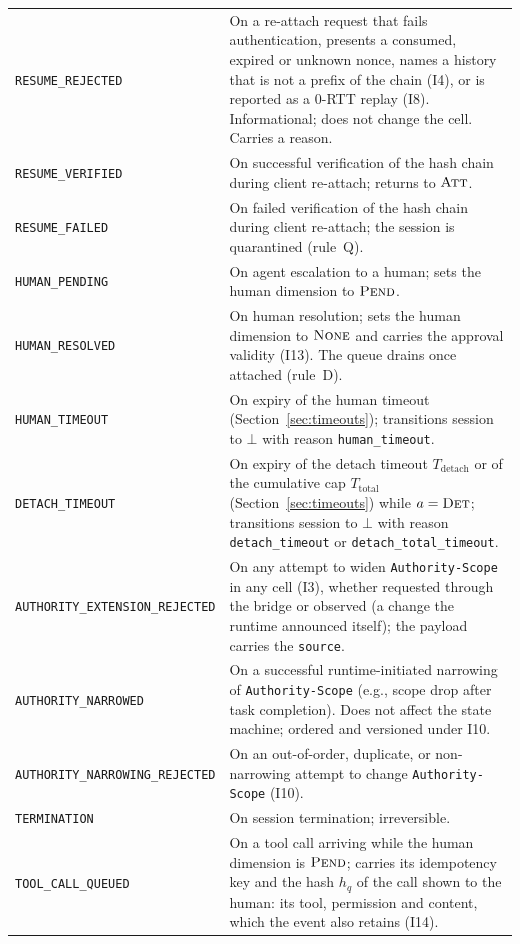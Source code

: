 \begin{longtable}{p{} p{}}
\texttt{RESUME\_REJECTED} & On a re-attach request that fails
authentication, presents a consumed, expired or unknown nonce, names a
history that is not a prefix of the chain (I4), or is reported as a
0-RTT replay (I8). Informational; does not change the cell. Carries a
reason. \\
\texttt{RESUME\_VERIFIED} & On successful verification of the
hash chain during client re-attach; returns to $\textsc{Att}$. \\
\texttt{RESUME\_FAILED} & On failed verification of the hash
chain during client re-attach; the session is quarantined (rule~Q). \\
\texttt{HUMAN\_PENDING} & On agent escalation to a human; sets the
human dimension to $\textsc{Pend}$. \\
\texttt{HUMAN\_RESOLVED} & On human resolution; sets the human dimension
to $\textsc{None}$ and carries the approval validity (I13). The queue
drains once attached (rule~D). \\
\texttt{HUMAN\_TIMEOUT} & On expiry of the human timeout
(Section~\ref{sec:timeouts}); transitions session to $\bot$ with
reason \texttt{human\_timeout}. \\
\texttt{DETACH\_TIMEOUT} & On expiry of the detach timeout $T_{\text{detach}}$ or of
the cumulative cap $T_{\text{total}}$
(Section~\ref{sec:timeouts}) while $a=\textsc{Det}$; transitions
session to $\bot$ with reason \texttt{detach\_timeout} or
\texttt{detach\_total\_timeout}. \\
\texttt{AUTHORITY\_EXTENSION\_REJECTED} & On any attempt to widen
\texttt{Authority-Scope} in any cell (I3), whether requested through the
bridge or observed (a change the runtime announced itself); the payload
carries the \texttt{source}. \\
\texttt{AUTHORITY\_NARROWED} & On a successful runtime-initiated
narrowing of \texttt{Authority-Scope} (e.g., scope drop after task
completion). Does not affect the state machine; ordered and versioned
under I10. \\
\texttt{AUTHORITY\_NARROWING\_REJECTED} & On an out-of-order, duplicate,
or non-narrowing attempt to change \texttt{Authority-Scope} (I10). \\
\texttt{TERMINATION} & On session termination; irreversible. \\
\texttt{TOOL\_CALL\_QUEUED} & On a tool call arriving while the
human dimension is $\textsc{Pend}$; carries its idempotency key and the
hash $h_q$ of the call shown to the human: its tool, permission and
content, which the event also retains (I14). \\

\end{longtable}
